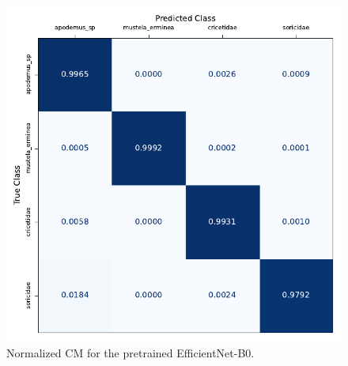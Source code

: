 \begin{figure}[ht]
\centering
\includegraphics{figures/conf_matrix_best.pdf}
\caption{Normalized \acs{CM} for the pretrained EfficientNet-B0.}
\label{fig:conf_matrix_best}
\end{figure}